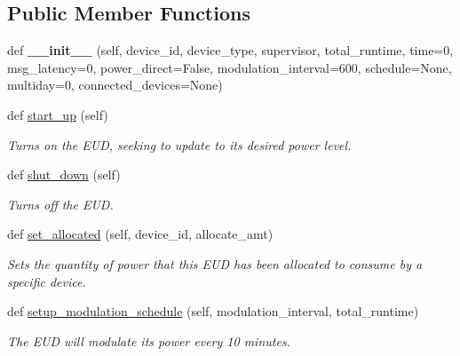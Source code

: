 \subsection*{Public Member Functions}
\begin{DoxyCompactItemize}
\item 
\mbox{\label{class_build_1_1_objects_1_1eud_1_1_eud_ae9a2bace7d3af75a2a0746ab6ea9103c}} 
def {\bfseries \+\_\+\+\_\+init\+\_\+\+\_\+} (self, device\+\_\+id, device\+\_\+type, supervisor, total\+\_\+runtime, time=0, msg\+\_\+latency=0, power\+\_\+direct=False, modulation\+\_\+interval=600, schedule=None, multiday=0, connected\+\_\+devices=None)
\item 
def \hyperlink{class_build_1_1_objects_1_1eud_1_1_eud_a8601f950b8b11f28f9ec0e80965c8b25}{start\+\_\+up} (self)
\begin{DoxyCompactList}\small\item\em Turns on the E\+UD, seeking to update to its desired power level. \end{DoxyCompactList}\item 
def \hyperlink{class_build_1_1_objects_1_1eud_1_1_eud_afc9354486371abba2f70e6a1605459e3}{shut\+\_\+down} (self)
\begin{DoxyCompactList}\small\item\em Turns off the E\+UD. \end{DoxyCompactList}\item 
\mbox{\label{class_build_1_1_objects_1_1eud_1_1_eud_a7a4ea640840f7c33015a204d83cc0b59}} 
def \hyperlink{class_build_1_1_objects_1_1eud_1_1_eud_a7a4ea640840f7c33015a204d83cc0b59}{set\+\_\+allocated} (self, device\+\_\+id, allocate\+\_\+amt)
\begin{DoxyCompactList}\small\item\em Sets the quantity of power that this E\+UD has been allocated to consume by a specific device. \end{DoxyCompactList}\item 
def \hyperlink{class_build_1_1_objects_1_1eud_1_1_eud_a6f7982b4d798f0a26222ec4a96366b9a}{setup\+\_\+modulation\+\_\+schedule} (self, modulation\+\_\+interval, total\+\_\+runtime)
\begin{DoxyCompactList}\small\item\em The E\+UD will modulate its power every 10 minutes. \end{DoxyCompactList}\item 

\end{DoxyCompactItemize}
